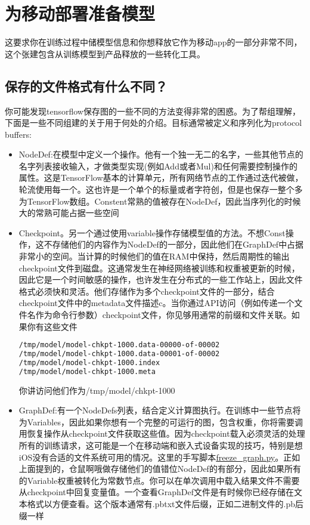 \section{为移动部署准备模型}
这要求你在训练过程中储模型信息和你想释放它作为移动app的一部分非常不同，这个张建包含从训练模型到产品释放的一些转化工具。
\subsection{保存的文件格式有什么不同？}
你可能发现tensorflow保存图的一些不同的方法变得非常的困惑。为了帮组理解，下面是一些不同组建的关于用于何处的介绍。目标通常被定义和序列化为protocol buffers:
\begin{itemize}
\item NodeDef:在模型中定义一个操作。他有一个独一无二的名字，一些其他节点的名字列表接收输入，才做类型实现(例如Add或者Mul)和任何需要控制操作的属性。这是TensorFlow基本的计算单元，所有网络节点的工作通过迭代被做，轮流使用每一个。这也许是一个单个的标量或者字符创，但是也保存一整个多为TensorFlow数组。Constent常熟的值被存在NodeDef，因此当序列化的时候大的常熟可能占据一些空间
\item Checkpoint。另一个通过使用variable操作存储模型值的方法。不想Const操作，这不存储他们的内容作为NodeDef的一部分，因此他们在GraphDef中占据非常小的空间。当计算的时候他们的值在RAM中保持，然后周期性的输出checkpoint文件到磁盘。这通常发生在神经网络被训练和权重被更新的时候，因此它是一个时间敏感的操作，也许发生在分布式的一些工作站上，因此文件格式必须快和灵活。他们存储作为多个checkpoint文件的一部分，结合checkpoint文件中的metadata文件描述c。当你通过API访问（例如传递一个文件名作为命令行参数）checkpoint文件，你见够用通常的前缀和文件关联。如果你有这些文件
\begin{lstlisting}[language=Bash]
/tmp/model/model-chkpt-1000.data-00000-of-00002
/tmp/model/model-chkpt-1000.data-00001-of-00002
/tmp/model/model-chkpt-1000.index
/tmp/model/model-chkpt-1000.meta
\end{lstlisting}
你讲访问他们作为/tmp/model/chkpt-1000
\item GraphDef:有一个NodeDefs列表，结合定义计算图执行。在训练中一些节点将为Variables，因此如果你想有一个完整的可运行的图，包含权重，你将需要调用恢复操作从checkpoint文件获取这些值。因为checkpoint载入必须灵活的处理所有的训练请求，这可能是一个在移动端和嵌入式设备实现的技巧，特别是想iOS没有合适的文件系统可用的情况。这里的手写脚本\href{https://www.github.com/tensorflow/tensorflow/blob/r1.4/tensorflow/python/tools/freeze_graph.py}{freeze\_graph.py}。正如上面提到的，仓鼠啊哦做存储他们的值错位NodeDef的有部分，因此如果所有的Variable权重被转化为常数节点。你可以在单次调用中载入结果文件不需要从checkpoint中回复变量值。一个查看GraphDef文件是有时候你已经存储在文本格式以方便查看。这个版本通常有.pbtxt文件后缀，正如二进制文件的.pb后缀一样

\end{itemize}
